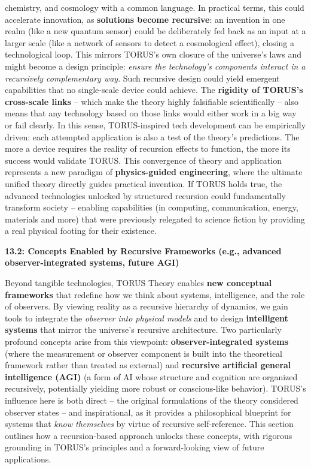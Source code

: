 \documentclass[
]{article}
\begin{document}
{\begin{itemize}
  chemistry, and cosmology with a common language. In practical terms,
  this could accelerate innovation, as \textbf{solutions become
  recursive}: an invention in one realm (like a new quantum sensor)
  could be deliberately fed back as an input at a larger scale (like a
  network of sensors to detect a cosmological effect), closing a
  technological loop. This mirrors TORUS's own closure of the universe's
  laws and might become a design principle: \emph{ensure the
  technology's components interact in a recursively complementary way}.
  Such recursive design could yield emergent capabilities that no
  single-scale device could achieve. The \textbf{rigidity of TORUS's
  cross-scale links} -- which make the theory highly falsifiable
  scientifically\hspace{0pt} -- also means that any technology based on
  those links would either work in a big way or fail clearly. In this
  sense, TORUS-inspired tech development can be empirically driven: each
  attempted application is also a test of the theory's predictions. The
  more a device requires the reality of recursion effects to function,
  the more its success would validate TORUS. This convergence of theory
  and application represents a new paradigm of \textbf{physics-guided
  engineering}, where the ultimate unified theory directly guides
  practical invention. If TORUS holds true, the advanced technologies
  unlocked by structured recursion could fundamentally transform society
  -- enabling capabilities (in computing, communication, energy,
  materials and more) that were previously relegated to science fiction
  by providing a real physical footing for their existence.
\end{itemize}

\textbf{13.2: Concepts Enabled by Recursive Frameworks (e.g., advanced
observer-integrated systems, future AGI)}

Beyond tangible technologies, TORUS Theory enables \textbf{new
conceptual frameworks} that redefine how we think about systems,
intelligence, and the role of observers. By viewing reality as a
recursive hierarchy of dynamics, we gain tools to integrate the
\emph{observer into physical models} and to design \textbf{intelligent
systems} that mirror the universe's recursive architecture. Two
particularly profound concepts arise from this viewpoint:
\textbf{observer-integrated systems} (where the measurement or observer
component is built into the theoretical framework rather than treated as
external) and \textbf{recursive artificial general intelligence (AGI)}
(a form of AI whose structure and cognition are organized recursively,
potentially yielding more robust or conscious-like behavior). TORUS's
influence here is both direct -- the original formulations of the theory
considered observer states -- and inspirational, as it provides a
philosophical blueprint for systems that \emph{know themselves} by
virtue of recursive self-reference. This section outlines how a
recursion-based approach unlocks these concepts, with rigorous grounding
in TORUS's principles and a forward-looking view of future applications.

}
\end{document}

